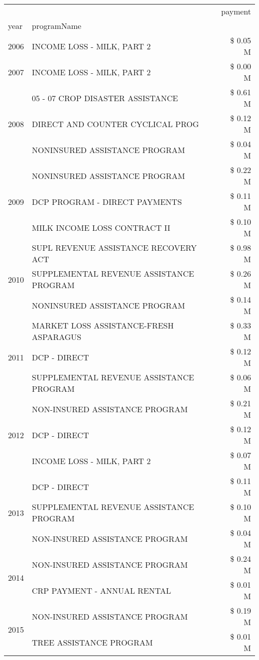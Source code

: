 \begin{tabular}{llr}
\toprule
 &  & payment \\
year & programName &  \\
\midrule
2006 & INCOME LOSS - MILK, PART 2 & \$ 0.05 M \\
\cline{1-3}
2007 & INCOME LOSS - MILK, PART 2 & \$ 0.00 M \\
\cline{1-3}
\multirow[t]{3}{*}{2008} & 05 - 07 CROP DISASTER ASSISTANCE & \$ 0.61 M \\
 & DIRECT AND COUNTER CYCLICAL PROG & \$ 0.12 M \\
 & NONINSURED ASSISTANCE PROGRAM & \$ 0.04 M \\
\cline{1-3}
\multirow[t]{3}{*}{2009} & NONINSURED ASSISTANCE PROGRAM & \$ 0.22 M \\
 & DCP PROGRAM - DIRECT PAYMENTS & \$ 0.11 M \\
 & MILK INCOME LOSS CONTRACT II & \$ 0.10 M \\
\cline{1-3}
\multirow[t]{3}{*}{2010} & SUPL REVENUE ASSISTANCE RECOVERY ACT & \$ 0.98 M \\
 & SUPPLEMENTAL REVENUE ASSISTANCE PROGRAM & \$ 0.26 M \\
 & NONINSURED ASSISTANCE PROGRAM & \$ 0.14 M \\
\cline{1-3}
\multirow[t]{3}{*}{2011} & MARKET LOSS ASSISTANCE-FRESH ASPARAGUS & \$ 0.33 M \\
 & DCP - DIRECT & \$ 0.12 M \\
 & SUPPLEMENTAL REVENUE ASSISTANCE PROGRAM & \$ 0.06 M \\
\cline{1-3}
\multirow[t]{3}{*}{2012} & NON-INSURED ASSISTANCE PROGRAM & \$ 0.21 M \\
 & DCP - DIRECT & \$ 0.12 M \\
 & INCOME LOSS - MILK, PART 2 & \$ 0.07 M \\
\cline{1-3}
\multirow[t]{3}{*}{2013} & DCP - DIRECT & \$ 0.11 M \\
 & SUPPLEMENTAL REVENUE ASSISTANCE PROGRAM & \$ 0.10 M \\
 & NON-INSURED ASSISTANCE PROGRAM & \$ 0.04 M \\
\cline{1-3}
\multirow[t]{2}{*}{2014} & NON-INSURED ASSISTANCE PROGRAM & \$ 0.24 M \\
 & CRP PAYMENT - ANNUAL RENTAL & \$ 0.01 M \\
\cline{1-3}
\multirow[t]{3}{*}{2015} & NON-INSURED ASSISTANCE PROGRAM & \$ 0.19 M \\
 & TREE ASSISTANCE PROGRAM & \$ 0.01 M \\

\end{tabular}
